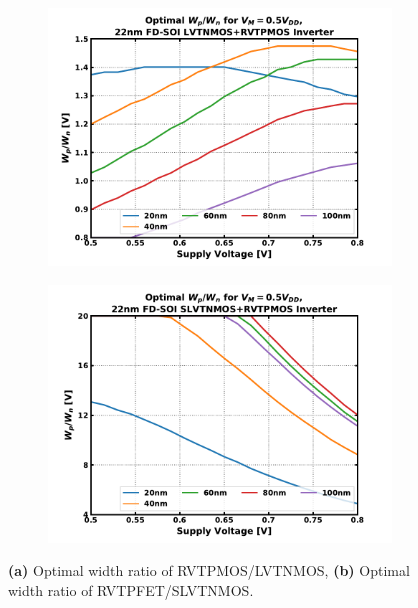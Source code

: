 			\begin{figure}[htb!]
			    \centering
			    \begin{subfigure}{0.5\textwidth}
			        \centering
			        \includegraphics[width=1\textwidth, angle=0]{./figs/design/lvtnfet_pfet}
			        \caption{ }
			        \label{fig:ratio_lvtn_p}
			    \end{subfigure}%
			    \begin{subfigure}{0.5\textwidth}
			        \centering
			        \includegraphics[width=1\textwidth, angle=0]{./figs/design/slvtnfet_pfet}
			        \caption{ }
			        \label{fig:ratio_slvtn_p}
			    \end{subfigure}
			    \caption{\textbf{(a)} Optimal width ratio of RVTPMOS/LVTNMOS, \textbf{(b)} Optimal width ratio of RVTPFET/SLVTNMOS.}
			    \label{fig:opt_ratio}
			\end{figure} 


